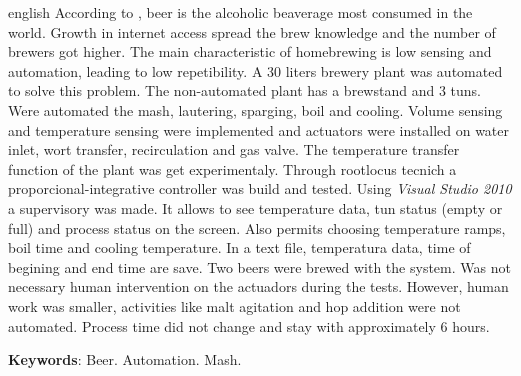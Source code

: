 \begin{resumo}[Abstract]
 \begin{otherlanguage*}{english}
According to , beer is the alcoholic beaverage most consumed in the world. Growth in internet access spread the brew knowledge and the number of brewers got higher. The main characteristic of homebrewing is low sensing and automation, leading to low repetibility. 
A 30 liters brewery plant was automated to solve this problem. The non-automated plant has a brewstand and 3 tuns. Were automated the mash, lautering, sparging, boil and cooling. Volume sensing and temperature sensing were implemented and actuators were installed on water inlet, wort transfer, recirculation and gas valve. 
The temperature transfer function of the plant was get experimentaly. Through rootlocus tecnich a proporcional-integrative controller was build and tested. 
Using \textit{Visual Studio 2010} a supervisory was made. It allows to see temperature data, tun status (empty or full) and process status on the screen. Also permits choosing temperature ramps, boil time and cooling temperature. In a text file, temperatura data, time of begining and end time are save.
Two beers were brewed with the system. Was not necessary human intervention on the actuadors during the tests. However, human work was smaller, activities like malt agitation and hop addition were not automated. Process time did not change and stay with approximately 6 hours. 

   \vspace{\onelineskip}
   \noindent 
   \textbf{Keywords}: Beer. Automation. Mash.
 \end{otherlanguage*}
\end{resumo}


\listoffigures*
\cleardoublepage

\listoftables*
\cleardoublepage

